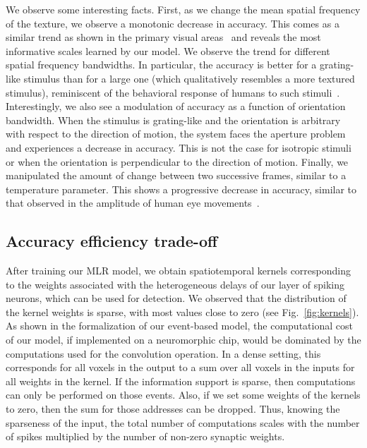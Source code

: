 \documentclass[default]{sn-jnl}%
\theoremstyle{thmstyleone}%
\theoremstyle{thmstyletwo}%
\theoremstyle{thmstylethree}%
\newcommand{\seeFig}[1]{see Fig.~\ref{fig:#1}}%
\begin{document}
We observe some interesting facts. First, as we change the mean spatial frequency of the texture, we observe a monotonic decrease in accuracy. This comes as a similar trend as shown in the primary visual areas~\citep{priebe_tuning_2006} and reveals the most informative scales learned by our model. We observe the trend for different spatial frequency bandwidths. In particular, the accuracy is better for a grating-like stimulus than for a large one (which qualitatively resembles a more textured stimulus), reminiscent of the behavioral response of humans to such stimuli~\citep{simoncini_more_2012, ravello_speed-selectivity_2019}. Interestingly, we also see a modulation of accuracy as a function of orientation bandwidth. When the stimulus is grating-like and the orientation is arbitrary with respect to the direction of motion, the system faces the aperture problem and experiences a decrease in accuracy. This is not the case for isotropic stimuli or when the orientation is perpendicular to the direction of motion. Finally, we manipulated the amount of change between two successive frames, similar to a temperature parameter. This shows a progressive decrease in accuracy, similar to that observed in the amplitude of human eye movements~\citep{mansour_pour_speed_2018}.
%
\subsection{Accuracy efficiency trade-off}%
After training our MLR model, we obtain spatiotemporal kernels corresponding to the weights associated with the heterogeneous delays of our layer of spiking neurons, which can be used for detection. We observed that the distribution of the kernel weights is sparse, with most values close to zero (\seeFig{kernels}). As shown in the formalization of our event-based model, the computational cost of our model, if implemented on a neuromorphic chip, would be dominated by the computations used for the convolution operation. In a dense setting, this corresponds for all voxels in the output to a sum over all voxels in the inputs for all weights in the kernel. If the information support is sparse, then computations can only be performed on those events. Also, if we set some weights of the kernels to zero, then the sum for those addresses can be dropped. Thus, knowing the sparseness of the input, the total number of computations scales with the number of spikes multiplied by the number of non-zero synaptic weights.
\end{document}
